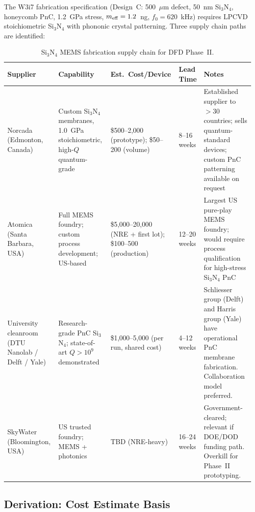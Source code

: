 \documentclass[11pt]{article}
\theoremstyle{definition}
\theoremstyle{remark}
\begin{document}
The W3i7 fabrication specification (Design~C: 500~$\mu$m defect,
50~nm Si$_3$N$_4$, honeycomb PnC, 1.2~GPa stress, $m_{\rm eff} = 1.2$~ng,
$f_0 = 620$~kHz) requires LPCVD stoichiometric Si$_3$N$_4$ with phononic
crystal patterning. Three supply chain paths are identified:

\begin{table}[H]
\centering
\caption{Si$_3$N$_4$ MEMS fabrication supply chain for DFD Phase~II.}
\label{tab:supply_chain}
\renewcommand{\arraystretch}{1.3}
\begin{tabular}{p{3cm}p{3cm}p{2.5cm}p{2cm}p{3cm}}
\toprule
\textbf{Supplier} & \textbf{Capability} & \textbf{Est.\ Cost/Device} &
\textbf{Lead Time} & \textbf{Notes} \\
\midrule
Norcada (Edmonton, Canada) &
  Custom Si$_3$N$_4$ membranes, 1.0~GPa stoichiometric, high-$Q$
  quantum-grade &
  \$500--2,000 (prototype); \$50--200 (volume) &
  8--16 weeks &
  Established supplier to $>30$ countries; sells quantum-standard
  devices; custom PnC patterning available on request \\
\midrule
Atomica (Santa Barbara, USA) &
  Full MEMS foundry; custom process development; US-based &
  \$5,000--20,000 (NRE + first lot); \$100--500 (production) &
  12--20 weeks &
  Largest US pure-play MEMS foundry; would require process
  qualification for high-stress Si$_3$N$_4$ PnC \\
\midrule
University cleanroom (DTU Nanolab / Delft / Yale) &
  Research-grade PnC Si$_3$N$_4$; state-of-art $Q > 10^9$
  demonstrated &
  \$1,000--5,000 (per run, shared cost) &
  4--12 weeks &
  Schliesser group (Delft) and Harris group (Yale) have operational
  PnC membrane fabrication. Collaboration model preferred. \\
\midrule
SkyWater (Bloomington, USA) &
  US trusted foundry; MEMS + photonics &
  TBD (NRE-heavy) &
  16--24 weeks &
  Government-cleared; relevant if DOE/DOD funding path.
  Overkill for Phase~II prototyping. \\
\bottomrule
\end{tabular}
\end{table}

\subsection{Derivation: Cost Estimate Basis}
\end{document}
